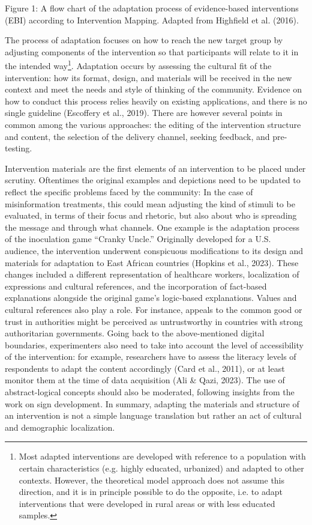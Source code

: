 \documentclass[authordate, empirical]{jote-new-article}
\begin{document}
	Figure 1: A flow chart of the adaptation process of evidence-based interventions (EBI) according to Intervention Mapping. Adapted from Highfield et al. (2016).



	The process of adaptation focuses on how to reach the new target group by adjusting components of the intervention so that participants will relate to it in the intended way\footnote{ Most adapted interventions are developed with reference to a population with certain characteristics (e.g. highly educated, urbanized) and adapted to other contexts. However, the theoretical model approach does not assume this direction, and it is in principle possible to do the opposite, i.e. to adapt interventions that were developed in rural areas or with less educated samples.}. Adaptation occurs by assessing the cultural fit of the intervention: how its format, design, and materials will be received in the new context and meet the needs and style of thinking of the community. Evidence on how to conduct this process relies heavily on existing applications, and there is no single guideline (Escoffery et al., 2019). There are however several points in common among the various approaches: the editing of the intervention structure and content, the selection of the delivery channel, seeking feedback, and pre-testing.



	Intervention materials are the first elements of an intervention to be placed under scrutiny. Oftentimes the original examples and depictions need to be updated to reflect the specific problems faced by the community: In the case of misinformation treatments, this could mean adjusting the kind of stimuli to be evaluated, in terms of their focus and rhetoric, but also about who is spreading the message and through what channels. One example is the adaptation process of the inoculation game “Cranky Uncle.” Originally developed for a U.S. audience, the intervention underwent conspicuous modifications to its design and materials for adaptation to East African countries (Hopkins et al., 2023). These changes included a different representation of healthcare workers, localization of expressions and cultural references, and the incorporation of fact-based explanations alongside the original game's logic-based explanations. Values and cultural references also play a role. For instance, appeals to the common good or trust in authorities might be perceived as untrustworthy in countries with strong authoritarian governments. Going back to the above-mentioned digital boundaries, experimenters also need to take into account the level of accessibility of the intervention: for example, researchers have to assess the literacy levels of respondents to adapt the content accordingly (Card et al., 2011), or at least monitor them at the time of data acquisition (Ali \& Qazi, 2023). The use of abstract-logical concepts should also be moderated, following insights from the work on sign development. In summary, adapting the materials and structure of an intervention is not a simple language translation but rather an act of cultural and demographic localization.
\end{document}

